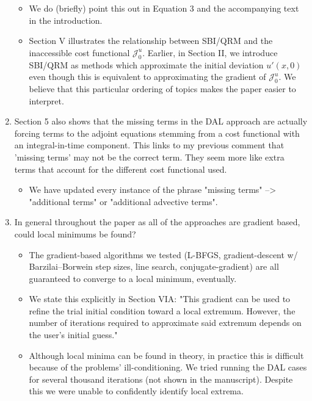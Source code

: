 \documentclass[%
 letter,
 amsmath,amssymb,
]{revtex4-2}
\begin{document}
\begin{enumerate}
\begin{itemize}
\item We do (briefly) point this out in Equation 3 and the accompanying text in the introduction.
\item Section V illustrates the relationship between SBI/QRM and the inaccessible cost functional $\mathcal{J}_0^u$. Earlier, in Section II,  we introduce SBI/QRM as methods which approximate the initial deviation $u'(x,0)$ even though this is equivalent to approximating the gradient of $\mathcal{J}_0^u$. We believe that this particular ordering of topics makes the paper easier to interpret.

\end{itemize}\color{black}\item Section 5 also shows that the missing terms in the DAL approach  are actually forcing terms to the adjoint equations stemming from a  cost functional with an integral-in-time component. This links to my  previous comment that 'missing terms' may not be the correct term.  They seem more like extra terms that account for the different cost  functional used.  \\
\color{blue}\begin{itemize}

\item We have updated every instance of the phrase "missing terms" --> "additional terms" or "additional advective terms".

\end{itemize}\color{black}\item In general throughout the paper as all of the approaches are gradient based, could local minimums be found?  \\
\color{blue}\begin{itemize}
  
\item The gradient-based algorithms we tested (L-BFGS, gradient-descent w/ Barzilai--Borwein step sizes, line search, conjugate-gradient) are all guaranteed to converge to a local minimum, eventually.
\item We state this explicitly in Section VIA: "This gradient can be used to refine the trial initial condition toward a local extremum. However, the number of iterations required to approximate said extremum depends on the user's initial guess."
\item Although local minima can be found in theory, in practice this is difficult because of the problems' ill-conditioning. We tried running the DAL cases for several thousand iterations (not shown in the manuscript). Despite this we were unable to confidently identify local extrema.
  

\end{itemize}
\end{enumerate}
\end{document}
